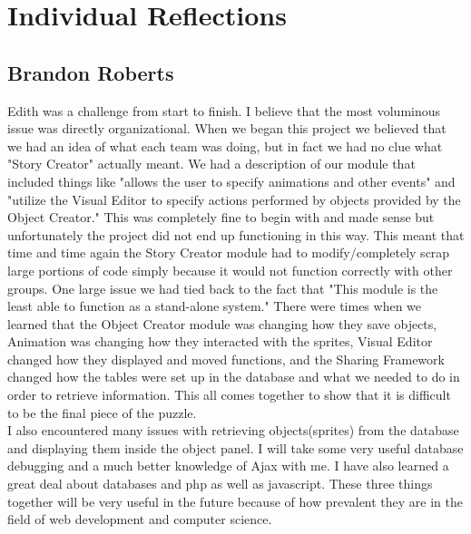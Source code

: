 \documentclass[12pt]{article}
\begin{document}
\section{Individual Reflections}

\subsection{Brandon Roberts}
Edith was a challenge from start to finish.  I believe that the most voluminous issue was directly organizational.  When we began this project we believed that we had an idea of what each team was doing, but in fact we had no clue what "Story Creator" actually meant.  We had a description of our module that included things like "allows the user to specify animations and other events" and "utilize the Visual Editor to specify actions performed by objects provided by the Object Creator."  This was completely fine to begin with and made sense but unfortunately the project did not end up functioning in this way.  This meant that time and time again the Story Creator module had to modify/completely scrap large portions of code simply because it would not function correctly with other groups.  One large issue we had tied back to the fact that "This module is the least able to function as a stand-alone system."  There were times when we learned that the Object Creator module was changing how they save objects, Animation was changing how they interacted with the sprites, Visual Editor changed how they displayed and moved functions, and the Sharing Framework changed how the tables were set up in the database and what we needed to do in order to retrieve information.  This all comes together to show that it is difficult to be the final piece of the puzzle.  \\

I also encountered many issues with retrieving objects(sprites) from the database and displaying them inside the object panel.  I will take some very useful database debugging and a much better knowledge of Ajax with me.  I have also learned a great deal about databases and php as well as javascript.  These three things together will be very useful in the future because of how prevalent they are in the field of web development and computer science. \\
\end{document}
